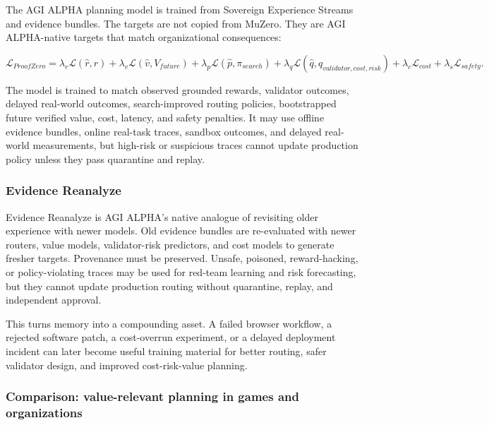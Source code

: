 \documentclass[11pt]{article}
\begin{document}
The AGI ALPHA planning model is trained from Sovereign Experience
Streams and evidence bundles. The targets are not copied from MuZero.
They are AGI ALPHA-native targets that match organizational
consequences:

\[
\mathcal{L}_{ProofZero}
=\lambda_r\mathcal{L}(\hat r,r)
+\lambda_v\mathcal{L}(\hat v,V_{future})
+\lambda_p\mathcal{L}(\hat p,\pi_{search})
+\lambda_q\mathcal{L}(\hat q,q_{validator,cost,risk})
+\lambda_c\mathcal{L}_{cost}
+\lambda_s\mathcal{L}_{safety}.
\]

The model is trained to match observed grounded rewards, validator
outcomes, delayed real-world outcomes, search-improved routing policies,
bootstrapped future verified value, cost, latency, and safety penalties.
It may use offline evidence bundles, online real-task traces, sandbox
outcomes, and delayed real-world measurements, but high-risk or
suspicious traces cannot update production policy unless they pass
quarantine and replay.

\subsubsection{Evidence Reanalyze}\label{evidence-reanalyze}

Evidence Reanalyze is AGI ALPHA's native analogue of revisiting older
experience with newer models. Old evidence bundles are re-evaluated with
newer routers, value models, validator-risk predictors, and cost models
to generate fresher targets. Provenance must be preserved. Unsafe,
poisoned, reward-hacking, or policy-violating traces may be used for
red-team learning and risk forecasting, but they cannot update
production routing without quarantine, replay, and independent approval.

This turns memory into a compounding asset. A failed browser workflow, a
rejected software patch, a cost-overrun experiment, or a delayed
deployment incident can later become useful training material for better
routing, safer validator design, and improved cost-risk-value planning.

\subsubsection{Comparison: value-relevant planning in games and
organizations}\label{comparison-value-relevant-planning-in-games-and-organizations}
\end{document}
